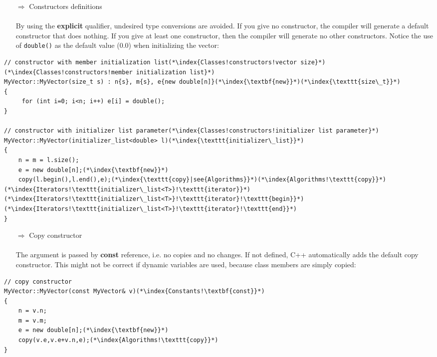 \documentclass[10pt]{article}
\begin{document}
\begin{enumerate}
\item[$\Rightarrow$] Constructors definitions\\ \\ By using the \textbf{explicit} qualifier, undesired type conversions are avoided. If you give no constructor, the compiler will generate a default constructor that does nothing.
If you give at least one constructor, then the compiler will generate no other constructors. Notice the use of \texttt{double()} as the default value (0.0)
when initializing the vector:
\end{enumerate}
\begin{lstlisting}
// constructor with member initialization list(*\index{Classes!constructors!vector size}*)(*\index{Classes!constructors!member initialization list}*)
MyVector::MyVector(size_t s) : n{s}, m{s}, e{new double[n]}(*\index{\textbf{new}}*)(*\index{\texttt{size\_t}}*)
{
     for (int i=0; i<n; i++) e[i] = double();
}

// constructor with initializer list parameter(*\index{Classes!constructors!initializer list parameter}*)
MyVector::MyVector(initializer_list<double> l)(*\index{\texttt{initializer\_list}}*)
{
    n = m = l.size();
    e = new double[n];(*\index{\textbf{new}}*)
    copy(l.begin(),l.end(),e);(*\index{\texttt{copy}|see{Algorithms}}*)(*\index{Algorithms!\texttt{copy}}*)(*\index{Iterators!\texttt{initializer\_list<T>}!\texttt{iterator}}*)(*\index{Iterators!\texttt{initializer\_list<T>}!\texttt{iterator}!\texttt{begin}}*)(*\index{Iterators!\texttt{initializer\_list<T>}!\texttt{iterator}!\texttt{end}}*)
}
\end{lstlisting}
\begin{enumerate}
\item[$\Rightarrow$] Copy constructor\\ \\ The argument is passed by \textbf{const} reference, i.e. no copies and no changes. If not defined, C++ automatically adds the default copy
constructor. This might not be correct if dynamic variables are used, because class members are simply copied:
\end{enumerate}
\begin{lstlisting}
// copy constructor
MyVector::MyVector(const MyVector& v)(*\index{Constants!\textbf{const}}*)
{
    n = v.n;
    m = v.m;
    e = new double[n];(*\index{\textbf{new}}*)
    copy(v.e,v.e+v.n,e);(*\index{Algorithms!\texttt{copy}}*)
}
\end{lstlisting}
\end{document}
